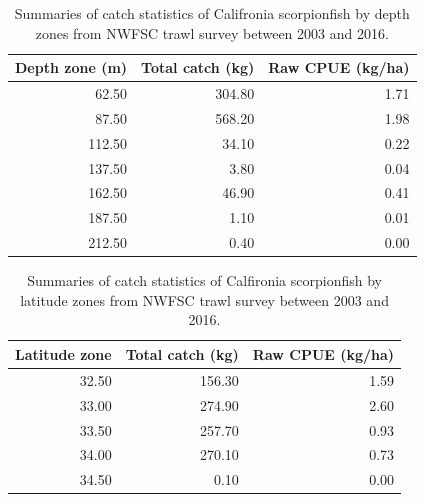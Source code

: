 \documentclass[12pt,]{article}
\begin{document}
\begin{table}[ht]
\centering
\caption{Summaries of catch statistics of 
                                          Califronia scorpionfish by depth zones 
                                          from NWFSC trawl survey between 2003 and 2016.} 
\label{tab:Fleet8_NWFSCTrawl_catchdepth}
\begin{tabular}{rrr}
  \hline
Depth zone (m) & Total catch (kg) & Raw CPUE (kg/ha) \\ 
  \hline
62.50 & 304.80 & 1.71 \\ 
  87.50 & 568.20 & 1.98 \\ 
  112.50 & 34.10 & 0.22 \\ 
  137.50 & 3.80 & 0.04 \\ 
  162.50 & 46.90 & 0.41 \\ 
  187.50 & 1.10 & 0.01 \\ 
  212.50 & 0.40 & 0.00 \\ 
   \hline
\end{tabular}
\end{table}\begin{table}[ht]
\centering
\caption{Summaries of catch statistics of 
                                          Calfironia scorpionfish by latitude zones 
                                          from NWFSC trawl survey between 2003 and 2016.} 
\label{tab:Fleet8_NWFSCTrawl_catchlat}
\begin{tabular}{rrr}
  \hline
Latitude zone & Total catch (kg) & Raw CPUE (kg/ha) \\ 
  \hline
32.50 & 156.30 & 1.59 \\ 
  33.00 & 274.90 & 2.60 \\ 
  33.50 & 257.70 & 0.93 \\ 
  34.00 & 270.10 & 0.73 \\ 
  34.50 & 0.10 & 0.00 \\ 
   \hline
\end{tabular}
\end{table}
\end{document}
